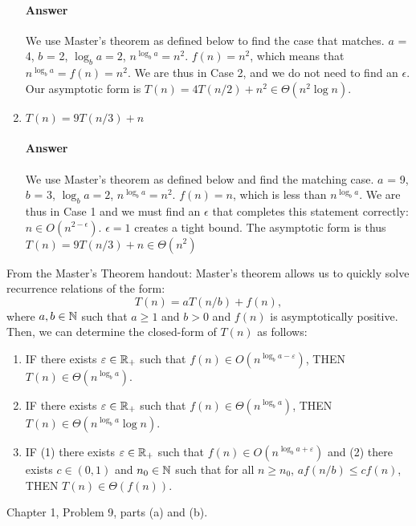 \documentclass{article}
\begin{document}
\begin{enumerate}
        \paragraph{Answer}{We use Master's theorem as defined below to find the case that matches. $a$ = 4, $b$ = 2, ${\log_b a} = 2$, $n^{\log_b a} = n^2$. $f(n) = n^2$, which means that $n^{\log_b a} = f(n) = n^2$. We are thus in Case 2, and we do not need to find an $\epsilon$. Our asymptotic form is $T(n) = 4 T(n/2) + n^2 \in \Theta(n^2\log{n})$. }
    \item $T(n) = 9 T(n/3) + n$
        \paragraph{Answer}{We use Master's theorem as defined below and find the matching case. $a$ = 9, $b$ = 3, ${\log_b a} = 2$, $n^{\log_b a} = n^2$. $f(n) = n$, which is less than $n^{\log_b a}$. We are thus in Case 1 and we must find an $\epsilon$ that completes this statement correctly: $n \in O(n^{2-\epsilon})$. $\epsilon = 1$ creates a tight bound. The asymptotic form is thus $T(n) = 9 T(n/3) + n \in \Theta(n^2)$}
\end{enumerate}

From the Master's Theorem handout: 
Master's theorem allows us to quickly solve recurrence relations of the form:
$$ T(n) = a T(n/b) + f(n),$$
where $a, b \in {\mathbb N}$ such that $a \geq 1$ and $b >0$ and $f(n)$ is asymptotically
positive.  Then, we can determine the closed-form of $T(n)$ as follows:
\begin{enumerate}
    \item IF there exists $\varepsilon \in {\mathbb R}_+$ such that $f(n) \in O(n^{\log_b
        a - \varepsilon})$, THEN $T(n) \in \Theta(n^{\log_b a})$.
    \item IF there exists $\varepsilon \in {\mathbb R}_+$ such that $f(n) \in \Theta(n^{\log_b
        a})$, THEN $T(n) \in \Theta(n^{\log_b a}\log n)$.
    \item IF (1) there exists $\varepsilon \in {\mathbb R}_+$ such that $f(n) \in O(n^{\log_b
        a + \varepsilon})$
        and (2) there exists $c \in (0,1)$ and $n_0 \in {\mathbb N}$ such that for all $n
        \geq n_0$, $a f(n/b) \leq c f(n)$, THEN $T(n) \in \Theta(f(n))$.
\end{enumerate}


\collab{\todo{}}

Chapter 1, Problem 9, parts (a) and (b).
\end{document}
